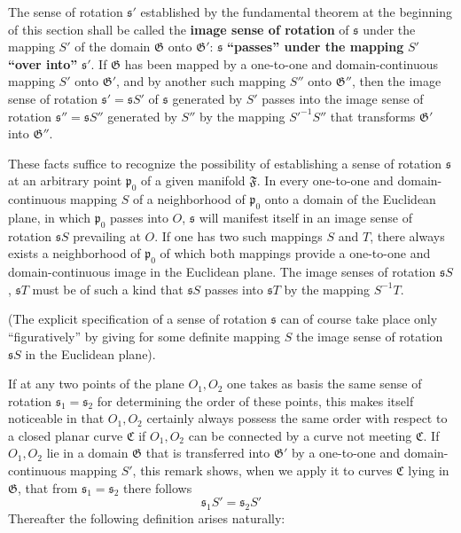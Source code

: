 \documentclass{article}
\begin{document}
The sense of rotation $\mathfrak{s}'$ established by the fundamental theorem at the beginning of this section shall be called the \textbf{image sense of rotation} of $\mathfrak{s}$ under the mapping $S'$ of the domain $\mathfrak{G}$ onto $\mathfrak{G}'$: $\mathfrak{s}$ \textbf{``passes'' under the mapping} $S'$ \textbf{``over into''} $\mathfrak{s}'$. If $\mathfrak{G}$ has been mapped by a one-to-one and domain-continuous mapping $S'$ onto $\mathfrak{G}'$, and by another such mapping $S''$ onto $\mathfrak{G}''$, then the image sense of rotation $\mathfrak{s}' = \mathfrak{s} S'$ of $\mathfrak{s}$ generated by $S'$ passes into the image sense of rotation $\mathfrak{s}'' = \mathfrak{s} S''$ generated by $S''$ by the mapping $S'^{-1} S''$ that transforms $\mathfrak{G}'$ into $\mathfrak{G}''$.

These facts suffice to recognize the possibility of establishing a sense of rotation $\mathfrak{s}$ at an arbitrary point $\mathfrak{p}_0$ of a given manifold $\mathfrak{F}$. In every one-to-one and domain-continuous mapping $S$ of a neighborhood of $\mathfrak{p}_0$ onto a domain of the Euclidean plane, in which $\mathfrak{p}_0$ passes into $O$, $\mathfrak{s}$ will manifest itself in an image sense of rotation $\mathfrak{s} S$ prevailing at $O$. If one has two such mappings $S$ and $T$, there always exists a neighborhood of $\mathfrak{p}_0$ of which both mappings provide a one-to-one and domain-continuous image in the Euclidean plane. The image senses of rotation $\mathfrak{s} S$, $\mathfrak{s} T$ must be of such a kind that $\mathfrak{s} S$ passes into $\mathfrak{s} T$ by the mapping $S^{-1} T$.

(The explicit specification of a sense of rotation $\mathfrak{s}$ can of course take place only ``figuratively'' by giving for some definite mapping $S$ the image sense of rotation $\mathfrak{s} S$ in the Euclidean plane).

If at any two points of the plane $O_1, O_2$ one takes as basis the same sense of rotation $\mathfrak{s}_1 = \mathfrak{s}_2$ for determining the order of these points, this makes itself noticeable in that $O_1, O_2$ certainly always possess the same order with respect to a closed planar curve $\mathfrak{C}$ if $O_1, O_2$ can be connected by a curve not meeting $\mathfrak{C}$. If $O_1, O_2$ lie in a domain $\mathfrak{G}$ that is transferred into $\mathfrak{G}'$ by a one-to-one and domain-continuous mapping $S'$, this remark shows, when we apply it to curves $\mathfrak{C}$ lying in $\mathfrak{G}$, that from $\mathfrak{s}_1 = \mathfrak{s}_2$ there follows
\[ \mathfrak{s}_1 S' = \mathfrak{s}_2 S' \]
Thereafter the following definition arises naturally:
\end{document}
